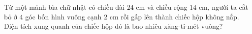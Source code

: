 \begin{ex} %
Từ một mảnh bìa chữ nhật có chiều dài $24\text{ cm}$ và chiều rộng $14\text{ cm}$, người ta cắt bỏ ở $4$ góc bốn hình vuông cạnh $2\text{ cm}$ rồi gấp lên thành chiếc hộp không nắp. Diện tích xung quanh của chiếc hộp đó là bao nhiêu xăng-ti-mét vuông?
\end{ex}
